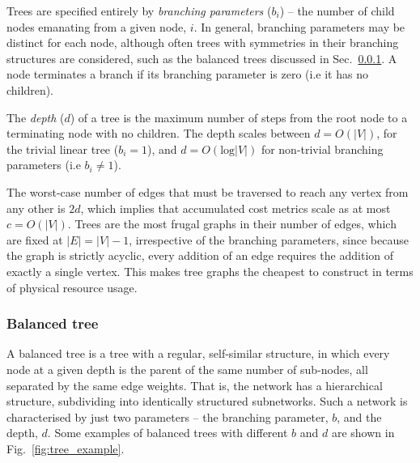 \documentclass[aps, rmp, twocolumn, amsmath, amssymb, nofootinbib, superscriptaddress, longbibliography, floatfix, table-of-contents, eqsecnum]{revtex4-1}
\begin{document}
Trees are specified entirely by \textit{branching parameters} ($b_i$) -- the number of child nodes emanating from a given node, $i$. In general, branching parameters may be distinct for each node, although often trees with symmetries in their branching structures are considered, such as the balanced trees discussed in Sec.~\ref{sec:bal_tree}. A node terminates a branch if its branching parameter is zero (i.e it has no children).

The \textit{depth} ($d$) of a tree is the maximum number of steps from the root node to a terminating node with no children. The depth scales between \mbox{$d=O(|V|)$}, for the trivial linear tree (\mbox{$b_i=1$}), and \mbox{$d=O(\text{log}|V|)$} for non-trivial branching parameters (i.e \mbox{$b_i\neq 1$}).

The worst-case number of edges that must be traversed to reach any vertex from any other is $2d$, which implies that accumulated cost metrics scale as at most \mbox{$c=O(|V|)$}. Trees are the most frugal graphs in their number of edges, which are fixed at \mbox{$|E|=|V|-1$}, irrespective of the branching parameters, since because the graph is strictly acyclic, every addition of an edge requires the addition of exactly a single vertex. This makes tree graphs the cheapest to construct in terms of physical resource usage.

%
%

\subsubsection{Balanced tree} \label{sec:bal_tree} 

A balanced tree is a tree with a regular, self-similar structure, in which every node at a given depth is the parent of the same number of sub-nodes, all separated by the same edge weights. That is, the network has a hierarchical structure, subdividing into identically structured subnetworks. Such a network is characterised by just two parameters -- the branching parameter, $b$, and the depth, $d$. Some examples of balanced trees with different $b$ and $d$ are shown in Fig.~\ref{fig:tree_example}.
\end{document}
